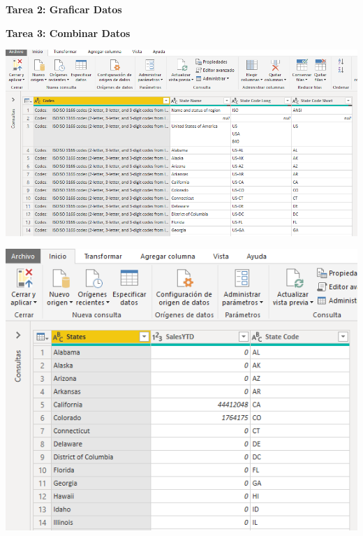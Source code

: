 \item \textbf{Tarea 2: Graficar Datos}

\item \textbf{Tarea 3: Combinar Datos} 
\begin{center}
\includegraphics[width=15cm]{./Imagenes/2} 
\end{center}
\begin{center}
\includegraphics[width=15cm]{./Imagenes/3} 
\end{center}

